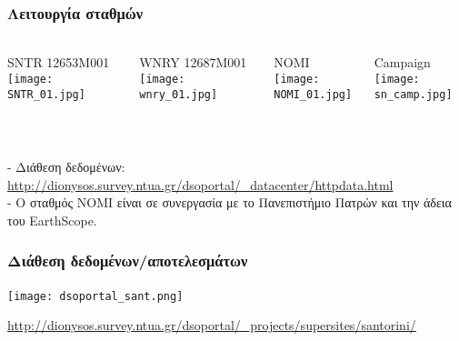 \begin{frame}
  \frametitle{Λειτουργία σταθμών}
  \framesubtitle{}
  \label{}
  \vskip-1cm
  \begin{columns}[T]
    \begin{column}{.25\textwidth}
      \begin{center}
      {\scriptsize SNTR 12653M001}
        \texttt{[image: SNTR\_01.jpg]}
      \end{center}  
    \end{column}
    \begin{column}{.25\textwidth}
      \begin{center}
       {\scriptsize WNRY 12687M001}
        \texttt{[image: wnry\_01.jpg]}
      \end{center}       
    \end{column}
  \begin{column}{.25\textwidth}
      \begin{center}
       {\scriptsize NOMI}
        \texttt{[image: NOMI\_01.jpg]}
      \end{center}  
    \end{column}
    \begin{column}{.25\textwidth}
      \begin{center}
       {\scriptsize Campaign}
        \texttt{[image: sn\_camp.jpg]}
      \end{center}       
    \end{column}
  \end{columns}  
  ~\\[1em]
\begin{scriptsize}
- Διάθεση δεδομένων: \url{http://dionysos.survey.ntua.gr/dsoportal/\_datacenter/httpdata.html}\\
- Ο σταθμός ΝΟΜΙ είναι σε συνεργασία με το Πανεπιστήμιο Πατρών και την άδεια του EarthScope.
\end{scriptsize}

\end{frame}
\note{}

\begin{frame}
  \frametitle{Διάθεση δεδομένων/αποτελεσμάτων}
  \framesubtitle{}
  \label{}
  \vskip-1.2cm
\begin{center}
  \texttt{[image: dsoportal\_sant.png]}
\end{center}
\url{http://dionysos.survey.ntua.gr/dsoportal/\_projects/supersites/santorini/}
\end{frame}
\note{}